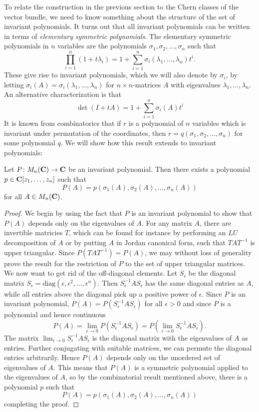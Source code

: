 \documentclass[a4paper,openany]{scrbook}
\begin{document}
To relate the construction in the previous section to the Chern classes of the vector bundle, we need to know something about the structure of the set of invariant polynomials. It turns out that all invariant polynomials can be written in terms of \emph{elementary symmetric polynomials}. The elementary symmetric polynomials in $n$ variables are the polynomials $\sigma_1, \sigma_2, \ldots, \sigma_n$ such that
\[\prod_{i = 1}^n (1 + t\lambda_i) = 1 + \sum_{i = 1}^n \sigma_i(\lambda_1, \ldots, \lambda_n)t^i.\]
These give rise to invariant polynomials, which we will also denote by $\sigma_i$, by letting $\sigma_i(A) = \sigma_i(\lambda_1, \ldots, \lambda_n)$ for $n \times n$-matrices $A$ with eigenvalues $\lambda_1, \ldots, \lambda_n$. An alternative characterization is that
\[\det(I + tA) = 1 + \sum_{i = 1}^n \sigma_i(A)t^i\]
It is known from combinatorics that if $r$ is a polynomial of $n$ variables which is invariant under permutation of the coordinates, then $r = q(\sigma_1, \sigma_2, \ldots, \sigma_n)$ for some polynomial $q$. We will show how this result extends to invariant polynomials:
\begin{lemma}
Let $P \colon M_n(\mathbf C) \to \mathbf C$ be an invariant polynomial. Then there exists a polynomial $p \in \mathbf C[z_1, \ldots, z_n]$ such that
\[P(A) = p(\sigma_1(A), \sigma_2(A), \ldots, \sigma_n(A))\]
for all $A \in M_n(\mathbf C)$.
\begin{proof}
We begin by using the fact that $P$ is an invariant polynomial to show that $P(A)$ depends only on the eigenvalues of $A$. For any matrix $A$, there are invertible matricies $T$, which can be found for instance by performing an $LU$ decomposition of $A$ or by putting $A$ in Jordan canonical form, such that $TAT^{-1}$ is upper triangular. Since $P(TAT^{-1}) = P(A)$, we may without loss of generality prove the result for the restriction of $P$ to the set of upper triangular matrices. We now want to get rid of the off-diagonal elements. Let $S_\epsilon$ be the diagonal matrix $S_\epsilon = \mathrm{diag}(\epsilon, \epsilon^2, \ldots, \epsilon^n)$. Then $S_\epsilon^{-1}AS_\epsilon$ has the same diagonal entries as $A$, while all entries above the diagonal pick up a positive power of $\epsilon$. Since $P$ is an invariant polynomial, $P(A) = P(S_\epsilon^{-1}AS_\epsilon)$ for all $\epsilon > 0$ and since $P$ is a polynomial and hence continuous
\[P(A) = \lim_{\epsilon \to 0} P(S_\epsilon^{-1}AS_\epsilon) = P(\lim_{\epsilon \to 0} S_\epsilon^{-1}AS_\epsilon).\]
The matrix $\lim_{\epsilon \to 0} S_\epsilon^{-1}AS_\epsilon$ is the diagonal matrix with the eigenvalues of $A$ as entries. Further conjugating with suitable matrices, we can permute the diagonal entries arbitrarily. Hence $P(A)$ depends only on the unordered set of eigenvalues of $A$. This means that $P(A)$ is a symmetric polynomial applied to the eigenvalues of $A$, so by the combinatorial result mentioned above, there is a polynomial $p$ such that
\[P(A) = p(\sigma_1(A), \sigma_2(A), \ldots, \sigma_n(A))\]
completing the proof.
\end{proof}
\end{lemma}
\end{document}
